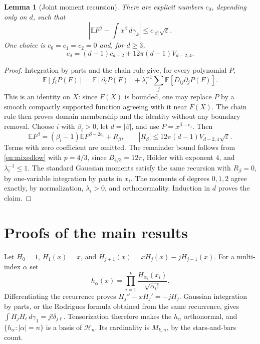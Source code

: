 \documentclass[12pt]{amsart}
\newtheorem{lem}[thm]{Lemma}
\theoremstyle{definition}
\theoremstyle{remark}
\numberwithin{equation}{section}
\newcommand{\E}{\mathbb E}
\newcommand{\gauss}{\gamma_k}
\newcommand{\eps}{\varepsilon}
\theoremstyle{plain}
\begin{document}
\begin{lem}[Joint moment recursion]\label{en:moments}
There are explicit numbers $c_d$, depending only on $d$, such that
\begin{equation}\label{en:momentbound}
 \left|\E F^\beta-\int x^\beta\,d\gauss\right|
 \leq c_{|\beta|}\sqrt\eps.
\end{equation}
One choice is $c_0=c_1=c_2=0$ and, for $d\geq3$,
\begin{equation}\label{en:momentconstant}
 c_d=(d-1)c_{d-2}+12\pi(d-1)V_{d-2,4}.
\end{equation}
\end{lem}
\begin{proof}
Integration by parts and the chain rule give, for every polynomial $P$,
\begin{equation}\label{en:ibp}
 \E[f_iP(F)]=\E[\partial_iP(F)]
       +\lambda_i^{-1}\sum_j\E[D_{ij}\partial_jP(F)].
\end{equation}
This is an identity on $X$: since $F(X)$ is bounded, one may replace $P$
by a smooth compactly supported function agreeing with it near $F(X)$.
The chain rule then proves domain membership and the identity without
any boundary removal.
Choose $i$ with $\beta_i>0$, let $d=|\beta|$, and use $P=x^{\beta-e_i}$.
Then
\[
 \E F^\beta=(\beta_i-1)\E F^{\beta-2e_i}+R_\beta,
 \qquad |R_\beta|\leq12\pi(d-1)V_{d-2,4}\sqrt\eps.
\]
Terms with zero coefficient are omitted. The remainder bound follows
from \eqref{en:mixedlow} with $p=4/3$, since $B_{4/3}=12\pi$,
H\"older with exponent $4$, and $\lambda_i^{-1}\leq1$.
The standard Gaussian moments satisfy the same recursion with
$R_\beta=0$, by one-variable integration by parts in $x_i$.
The moments of degrees $0,1,2$ agree exactly, by normalization,
$\lambda_i>0$, and orthonormality. Induction in $d$ proves the claim.
\end{proof}

\section{Proofs of the main results}
Let $H_0=1$, $H_1(x)=x$, and
$H_{j+1}(x)=xH_j(x)-jH_{j-1}(x)$. For a multi-index $\alpha$ set
\[
 h_\alpha(x)=\prod_{i=1}^k\frac{H_{\alpha_i}(x_i)}{\sqrt{\alpha_i!}}.
\]
Differentiating the recurrence proves
$H_j''-xH_j'=-jH_j$. Gaussian integration by parts, or the Rodrigues
formula obtained from the same recurrence, gives
$\int H_jH_\ell\,d\gamma_1=j!\delta_{j\ell}$.
Tensorization therefore makes the $h_\alpha$ orthonormal, and
$\{h_\alpha:|\alpha|=n\}$ is a basis of $\mathcal H_n$.
Its cardinality is $M_{k,n}$, by the stars-and-bars count.
\end{document}
